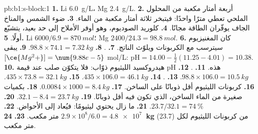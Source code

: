 \begin{solution}{pb:b1:s-block:1}
\textbf{1.} Li \qty{6.0}{g/L}، Mg \qty{2.4}{g/L}.
\textbf{2.} أربعة أمتار مكعبة من المحلول الملحي تعطي مترًا واحدًا: فيتبخر ثلاثة أمتار مكعبة من
الماء.
\textbf{3.} ضوء الشمس والمناخ الجاف يوفّران الطاقة مجانًا.
\textbf{4.} كلوريد الصوديوم، وهو أوفر الأملاح إلى حد بعيد، يتشبّع
أولًا.
\textbf{5.} Li $6000/6.9 = \qty{870}{mol}$؛ Mg $2400/24.3 = \qty{98.8}{mol}$.
\textbf{6.} كان المغنيزيوم سيترسب مع الكربونات
ويلوّث الناتج.
\textbf{7.} .
\textbf{8.} $98.8 \times 74.1 = \qty{7.32}{kg}$.
\textbf{9.} يبقى $[\ce{Mg^2+}] = \num{9.88e-5}$ mol/L: $\mathrm{pH} = 14.00 -
\frac12(11.25 - 4.01) = 10.38$.
\textbf{10.} هيدروكسيد الليثيوم ذوّاب: فلا يتكوّن صلب عند قيمة pH هذه.
\textbf{11.} .
\textbf{12.} $98.8 \times 106.0 = \qty{10.5}{kg}$.
\textbf{13.} .
\textbf{14.} $435 \times 106.0 = \qty{46.1}{kg}$.
\textbf{15.} $435 \times 73.8 = \qty{32.1}{kg}$.
\textbf{16.} كربونات الليثيوم أقل ذوبانًا على الساخن.
\textbf{17.} $0.0084 \times 1000 = \qty{8.4}{kg}$.
\textbf{18.} بكميات صغيرة من الماء الساخن، الذي تكون فيه أقل
ذوبانًا.
\textbf{19.} $32.1 - 8.4 = \qty{23.7}{kg}$.
\textbf{20.} $23.7/32.1 = \qty{74}{\percent}$.
\textbf{21.} ما زال يحتوي ليثيومًا: فيُعاد إلى الأحواض.
\textbf{22.} $2.9 \times 10^8/6.0 = \num{4.8e7}$ متر مكعب.
\textbf{23.} \textbf{\qty{24}{kg}} (23.7) من كربونات الليثيوم لكل متر
مكعب.
\end{solution}
